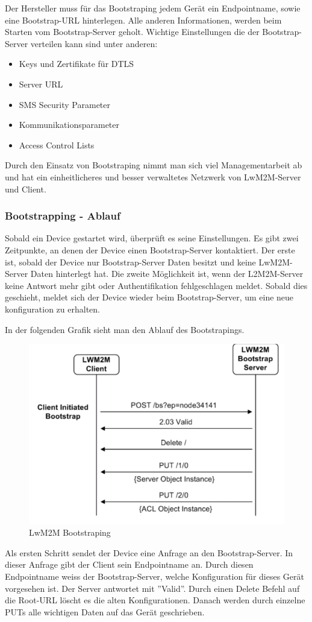 Der Hersteller muss für das Bootstraping jedem Gerät ein Endpointname, sowie eine Bootstrap-URL hinterlegen. Alle anderen Informationen, werden beim Starten vom Bootstrap-Server geholt.
Wichtige Einstellungen die der Bootstrap-Server verteilen kann sind unter anderen\cite{BootstrapFeatures}:
\begin{itemize}
\item Keys  und Zertifikate für DTLS
\item Server URL
\item SMS Security Parameter
\item Kommunikationsparameter
\item Access Control Lists
\end{itemize}
Durch den Einsatz von Bootstraping nimmt man sich viel Managementarbeit ab und hat ein einheitlicheres und besser verwaltetes Netzwerk von LwM2M-Server und Client.
\subsubsection{Bootstrapping - Ablauf}
Sobald ein Device gestartet wird, überprüft es seine Einstellungen. Es gibt zwei Zeitpunkte, an denen der Device einen Bootstrap-Server kontaktiert. Der erste ist, sobald der Device nur Bootstrap-Server Daten besitzt und keine LwM2M-Server Daten hinterlegt hat. Die zweite Möglichkeit ist, wenn der L2M2M-Server keine Antwort mehr gibt oder Authentifikation fehlgeschlagen meldet. Sobald dies geschieht, meldet sich der Device wieder beim Bootstrap-Server, um eine neue konfiguration zu erhalten.

In der folgenden Grafik sieht man den Ablauf des Bootstrapings.
\begin{figure}[H]
\includegraphics[scale=0.5]{../02_Analyse/images/lwm2m/bootstrap_diagram.png}
\caption{LwM2M Bootstraping\cite{LwM2MInterfaces}}
\end{figure}
Als ersten Schritt sendet der Device eine Anfrage an den Bootstrap-Server. In dieser Anfrage gibt der Client sein Endpointname an. Durch diesen Endpointname weiss der Bootstrap-Server, welche Konfiguration für dieses Gerät vorgesehen ist. Der Server antwortet mit ''Valid''. Durch einen Delete Befehl auf die Root-URL löscht es die alten Konfigurationen. Danach werden durch einzelne PUTs alle wichtigen Daten auf das Gerät geschrieben.

